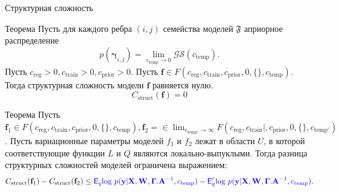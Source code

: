 \documentclass[usenames,dvipsnames,11pt,pdf,utf8,russian,aspectratio=169]{beamer}
\begin{document}
\begin{frame}{Структурная сложность}
\small

\begin{block}{Теорема}
Пусть для каждого ребра $(i,j)$ семейства моделей $\mathfrak{F}$ априорное распределение $$p(\boldsymbol{\gamma}_{i,j}) =  \lim_{c_{\text{temp}} \to 0} \mathcal{GS}(c_{\text{temp}}).$$
Пусть $c_{\text{reg}} >0, c_{\text{train}} >0, c_{\text{prior}}>0$.
Пусть $\mathbf{f} \in F(c_{\text{reg}}, c_{\text{train}}, c_{\text{prior}}, 0, \{\}, c_{\text{temp}})$.
Тогда структурная сложность модели $\mathbf{f}$ равняется нулю.
\[
    C_\text{struct}(\mathbf{f}) = 0
\]
\end{block}

\begin{block}{Теорема}
Пусть $\mathbf{f}_1 \in F(c_{\text{reg}}, c_{\text{train}},  c_{\text{prior}}, 0, \{\},  c_{\text{temp}}), \mathbf{f}_2 =  \in \lim_{c_{\text{temp}'} \to \infty} F(c_{\text{reg}}, c_{\text{train}}|,  c_{\text{prior}}, 0, \{\},  c_{\text{temp}'})$.
Пусть вариационные параметры моделей $f_1$ и $f_2$ лежат в области $U$, в которой соответствующие функции $L$ и $Q$ являются локально-выпуклыми. 
Тогда разница структурных сложностей моделей ограничена выражением:
\[
    C_\text{struct}(\mathbf{f}_1)  - C_\text{struct}(\mathbf{f}_2) \leq \textcolor{blue}{\mathsf{E}_q \text{log}~{p(\mathbf{y} | \mathbf{X}, \mathbf{W}, \boldsymbol{\Gamma}. \mathbf{A}^{-1}, c_{\text{temp}})}} - \textcolor{blue}{\mathsf{E}_q' \text{log}~{p(\mathbf{y} | \mathbf{X}, \mathbf{W}, \boldsymbol{\Gamma}. \mathbf{A}^{-1}, c_{\text{temp}})}}.
\]
\end{block}

\end{frame}
\end{document}
